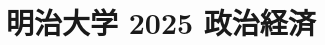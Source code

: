\documentclass[../../uem_mat_mei_q.tex]{subfiles}
\begin{document}
    \section{明治大学 2025 政治経済}
    \subsection{　}
    
    \newpage
    \subsection{　}
    
\end{document}

